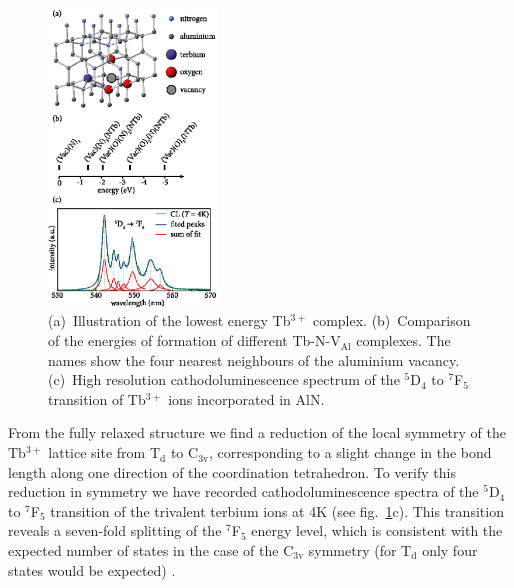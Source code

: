 \documentclass[%
 aip,
rsi,%
 amsmath,amssymb,
 reprint,%
]{revtex4-1}
\begin{document}
\begin{figure}
	\includegraphics[width=0.4\textwidth]{model}
    \caption{(a)~Illustration of the lowest energy Tb$^{3+}$ complex. (b)~Comparison of the energies of formation of different Tb-N-V$_\text{Al}$ complexes. The names show the four nearest neighbours of the aluminium vacancy. (c)~High resolution cathodoluminescence spectrum of the $^5$D$_4$ to $^7$F$_5$ transition of Tb$^{3+}$ ions incorporated in AlN.}
    \label{fig:felix_model}
\end{figure}
From the fully relaxed structure we find a reduction of the local symmetry of the Tb$^{3+}$ lattice site from T$_\text{d}$ to C$_\text{3v}$, corresponding to a slight change in the bond length along one direction of the coordination tetrahedron. To verify this reduction in symmetry we have recorded cathodoluminescence spectra of the $^5$D$_4$ to $^7$F$_5$ transition of the trivalent terbium ions at 4K (see fig.~\ref{fig:felix_model}c). This transition reveals a seven-fold splitting of the $^7$F$_5$ energy level, which is consistent with the expected number of states in the case of the C$_\text{3v}$ symmetry (for T$_\text{d}$ only four states would be expected) \cite{henderson05}.
\end{document}
